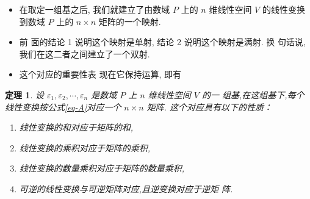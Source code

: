 \documentclass[13pt]{beamer}
\newtheorem{thm}{定理}
\begin{document}
\begin{frame}
\begin{itemize}
\item 在取定一组基之后, 我们就建立了由数域 $P$ 上的 $n$ 维线性空间 $V$ 的线性变换到数域 $P$ 上的 $n \times n$ 矩阵的一个映射. 

\item 前 面的结论 1 说明这个映射是单射, 结论 2 说明这个映射是满射. 换 句话说,我们在这二者之间建立了一个双射. 
\item 这个对应的重要性表 现在它保持运算, 即有
\end{itemize}

\begin{thm}
设 ${\varepsilon}_{1}, {\varepsilon}_{2}, \cdots, {\varepsilon}_{n}$ 是数域 $P$ 上 $n$ 维线性空间 $V$ 的一
组基,在这组基下,每个线性变换按公式\eqref{eq-A}对应一个 $n \times n$ 矩阵. 这个对应具有以下的性质：
\begin{enumerate}
	\item 线性变换的和对应于矩阵的和,
	\item 线性变换的乘积对应于矩阵的乘积,
	\item 线性变换的数量乘积对应于矩阵的数量乘积,
	\item 可逆的线性变换与可逆矩阵对应,且逆变换对应于逆矩
	阵.
\end{enumerate}
\end{thm}
\end{frame}
\end{document}
